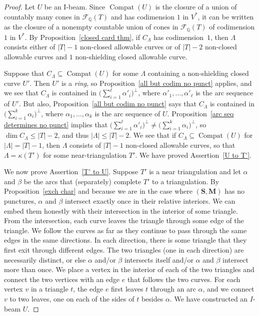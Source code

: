 \documentclass{amsart}
\theoremstyle{definition}
\theoremstyle{remark}
\numberwithin{equation}{section}
\newcommand{\rationals}{\mathbb Q}
\newcommand{\F}{{\mathcal F}}
\newcommand{\0}{{\mathbf{0}}}
\newcommand{\M}{\mathbf{M}}
\renewcommand{\S}{\mathbf{S}}
\newcommand{\Compat}{\operatorname{Compat}}
\begin{document}
\begin{proof}
Let $U$ be an I-beam.
Since $\Compat(U)$ is the closure of a union of countably many cones in $\F_\rationals(T)$ and has codimension $1$ in $V^*$, it can be written as the closure of a nonempty countable union of cones in $\F_\rationals(T)$ of codimension $1$ in $V^*$.
By Proposition~\ref{closed card thm}, if $C_\Lambda$ has codimension~$1$, then $\Lambda$ consists either of $|T|-1$ non-closed allowable curves or of $|T|-2$ non-closed allowable curves and $1$ non-shielding closed allowable curve.

Suppose that $C_\Lambda\subseteq\Compat(U)$ for some $\Lambda$ containing a non-shielding closed curve $U'$.
Then $U'$ is a \emph{ring}, so Proposition~\ref{all but codim no punct} applies, and we see that $C_\Lambda$ is contained in $\bigl(\sum_{i=1}^\ell\alpha'_i\bigr)^\perp$, where $\alpha'_1,\ldots,\alpha'_\ell$ is the arc sequence of $U'$.
But also, Proposition~\ref{all but codim no punct} says that $C_\Lambda$ is contained in $\bigl(\sum_{i=1}^k\alpha_i\bigr)^\perp$, where $\alpha_1,\ldots,\alpha_k$ is the arc sequence of $U$.
Proposition~\ref{arc seq determines no punct} implies that $\bigl(\sum_{i=1}^\ell\alpha'_i\bigr)^\perp\neq\bigl(\sum_{i=1}^k\alpha_i\bigr)^\perp$,  so $\dim C_\Lambda\le|T|-2$, and thus $|\Lambda|\le|T|-2$.
We see that if $C_\Lambda\subseteq\Compat(U)$ for $|\Lambda|=|T|-1$, then $\Lambda$ consists of $|T|-1$ non-closed allowable curves, so that $\Lambda=\kappa(T')$ for some near-triangulation $T'$.
We have proved Assertion~\ref{U to T'}.

We now prove Assertion~\ref{T' to U}.
Suppose $T'$ is a near triangulation and let $\alpha$ and $\beta$ be the arcs that (separately) complete $T'$ to a triangulation.
By Proposition~\ref{exch char} and because we are in the case where $(\S,\M)$ has no punctures, $\alpha$ and $\beta$ intersect exactly once in their relative interiors.
We can embed them honestly with their intersection in the interior of some triangle.
From the intersection, each curve leaves the triangle through some edge of the triangle.
We follow the curves as far as they continue to pass through the same edges in the same directions.
In each direction, there is some triangle that they first exit through different edges.
The two triangles (one in each direction) are necessarily distinct, or else $\alpha$ and/or $\beta$ intersects itself and/or $\alpha$ and $\beta$ intersect more than once.
We place a vertex in the interior of each of the two triangles and connect the two vertices with an edge $e$ that follows the two curves.
For each vertex $v$ in a triangle $t$, the edge $e$ first leaves $t$ through an arc $\alpha$, and we connect $v$ to two leaves, one on each of the sides of $t$ besides $\alpha$.
We have constructed an $I$-beam $U$.


\end{proof}
\end{document}
